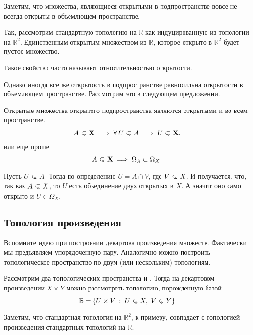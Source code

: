     \begin{Note}
        Заметим, что множества, являющиеся открытыми в подпространстве вовсе не всегда открыты в объемлющем пространстве.

        Так, рассмотрим стандартную топологию на $\mathbb{R}$ как индуцированную из топологии на $\mathbb{R}^2$. Единственным открытым множеством из $\mathbb{R}$, которое открыто в $\mathbb{R}^2$ будет пустое множество. 

        Такое свойство часто называют относительностью открытости.
    \end{Note}

 Однако иногда все же открытость в подпространстве равносильна открытости в объемлющем пространстве. Рассмотрим это в следующем предложении.

    \begin{Prop}
        Открытые множества открытого подпространства являются открытыми и во всем пространстве.
        \[
        A \open \X  \implies \forall U \open A \implies U \open \X.
        \] 
        или еще проще
        \[
        A \open \X \implies \Omega_A \subset \Omega_X.
        \] 
    \end{Prop}
    \begin{Proof}
        Пусть $U\open A$. Тогда по определению $U = A \cap V$, где $V \open X$. И получается, что, так как $A \open X$, то $U$ есть объединение двух открытых в $X$. А значит оно само открыто и $U \in \Omega_X$. 
    \end{Proof}

    \subsection{Топология произведения}
    Вспомните идею при построении декартова произведения множеств. Фактически мы предъявляем упорядоченную пару. Аналогично можно построить топологическое пространство по двум (или нескольким) топологиям. 
    \begin{Def}
        Рассмотрим два топологических пространства \topX и \topY. Тогда на декартовом произведении  $X \times Y$ можно рассмотреть топологию, порожденную базой
         \[
             \mathbb{B} = \{ U \times V \st U \open X, \; V \open Y\}
        \] 
    \end{Def}
    \begin{Ex}
        Заметим, что стандартная топология на $\mathbb{R}^2$, к примеру, совпадает с топологией произведения стандартных топологий на $\mathbb{R}$. 
    \end{Ex}

